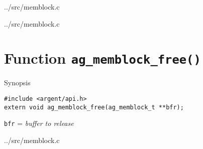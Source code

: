 \lstset{style=CODE}

  {../src/memblock.c}

\lstset{style=CODE}

  {../src/memblock.c}



%


\section{Function \texttt{ag\_memblock\_free()}}
  \begin{bclogo}[logo=\bccrayon, noborder=true, barre=snake, couleurBarre=gray]
    {Synopsis}
  \lstset{style=SYNOPSIS}
  \begin{lstlisting}[linewidth=1.0\linewidth]
#include <argent/api.h>
extern void ag_memblock_free(ag_memblock_t **bfr);
  \end{lstlisting}
  \scriptsize
  \texttt{bfr} = \emph{buffer to release} \\
  \end{bclogo}

\lstset{style=CODE}

  {../src/memblock.c}
